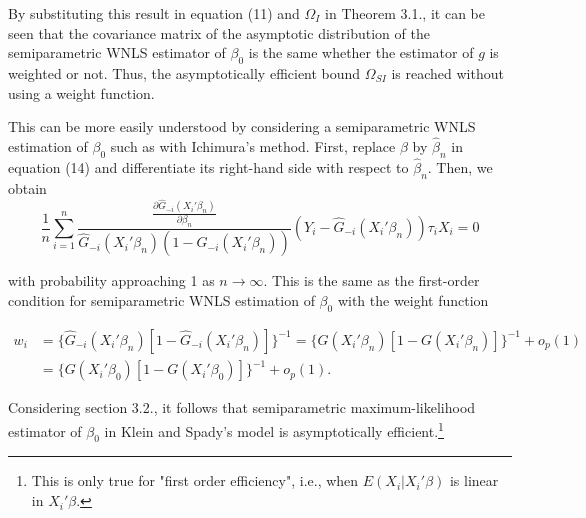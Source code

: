 \documentclass[a4paper]{article}
\begin{document}
By substituting this result in equation (11) and $\Omega_I$ in Theorem 3.1., it can be seen that the covariance matrix of the asymptotic distribution of the semiparametric WNLS estimator of $\beta_0$ is the same whether the estimator of $g$ is weighted or not. Thus, the asymptotically efficient bound $\Omega_{SI}$ is reached without using a weight function. 




This can be more easily understood by considering a semiparametric WNLS estimation of $\beta_0$ such as with Ichimura's method. First, replace $\beta$ by $ \hat{\beta}_n$ in equation (14) and differentiate its right-hand side with respect to $\hat{\beta}_n$. Then, we obtain
\begin{equation}
\frac{1}{n} \sum_{i=1}^n \frac{\frac{\partial\hat{G}_{-i}(X_i'\beta_n)}{\partial \beta_n}}{\hat{G}_{-i}(X_i'\beta_n)(1 - \hat{G}_{-i}(X_i'\beta_n))} (Y_i - \hat{G}_{-i}(X_i'\beta_n))\tau_i X_i  = 0
\end{equation} 

with probability approaching 1 as $n \rightarrow \infty$. This is the same as the first-order condition for semiparametric WNLS estimation of $\beta_0$ with the weight function

\begin{align*}
w_i & = \{ \hat{G}_{-i}(X_i'\beta_n)[ 1 - \hat{G}_{-i}(X_i'\beta_n)]\}^{-1} = \{ G(X_i'\beta_n)[ 1 - G(X_i'\beta_n)]\}^{-1} + o_p(1) \\
     & = \{ G(X_i'\beta_0)[ 1 - G(X_i'\beta_0)]\}^{-1} + o_p(1).
\end{align*}


Considering section 3.2., it follows that semiparametric maximum-likelihood estimator of $\beta_0$ in Klein and Spady's model is asymptotically efficient.\footnote{This is only true for "first order efficiency", i.e., when $E(X_i|X_i'\beta)$ is linear in $X_i'\beta$.}
\end{document}
